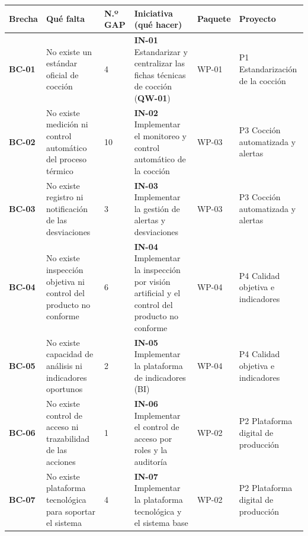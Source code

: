\begin{table}[H]
  \centering
  \renewcommand{\arraystretch}{1.3}
  \setlength{\tabcolsep}{4pt}
  \small
  \begin{tabularx}{\textwidth}{|C{1.35cm}|>{\raggedright\arraybackslash}X|C{1.2cm}|>{\raggedright\arraybackslash}X|C{1.55cm}|L{2.8cm}|}
    \hline
    {\color{white}\bfseries Brecha} &
    {\color{white}\bfseries Qué falta} &
    {\color{white}\bfseries N.º GAP} &
    {\color{white}\bfseries Iniciativa (qué hacer)} &
    {\color{white}\bfseries Paquete} &
    {\color{white}\bfseries Proyecto} \\ \hline
    \textbf{BC-01} & No existe un estándar oficial de cocción & 4 & \textbf{IN-01} Estandarizar y centralizar las fichas técnicas de cocción (\textbf{QW-01}) & WP-01 & P1 Estandarización de la cocción \\ \hline
    \textbf{BC-02} & No existe medición ni control automático del proceso térmico & 10 & \textbf{IN-02} Implementar el monitoreo y control automático de la cocción & WP-03 & P3 Cocción automatizada y alertas \\ \hline
    \textbf{BC-03} & No existe registro ni notificación de las desviaciones & 3 & \textbf{IN-03} Implementar la gestión de alertas y desviaciones & WP-03 & P3 Cocción automatizada y alertas \\ \hline
    \textbf{BC-04} & No existe inspección objetiva ni control del producto no conforme & 6 & \textbf{IN-04} Implementar la inspección por visión artificial y el control del producto no conforme & WP-04 & P4 Calidad objetiva e indicadores \\ \hline
    \textbf{BC-05} & No existe capacidad de análisis ni indicadores oportunos & 2 & \textbf{IN-05} Implementar la plataforma de indicadores (BI) & WP-04 & P4 Calidad objetiva e indicadores \\ \hline
    \textbf{BC-06} & No existe control de acceso ni trazabilidad de las acciones & 1 & \textbf{IN-06} Implementar el control de acceso por roles y la auditoría & WP-02 & P2 Plataforma digital de producción \\ \hline
    \textbf{BC-07} & No existe plataforma tecnológica para soportar el sistema & 4 & \textbf{IN-07} Implementar la plataforma tecnológica y el sistema base & WP-02 & P2 Plataforma digital de producción \\ \hline

\end{tabularx}
\end{table}
